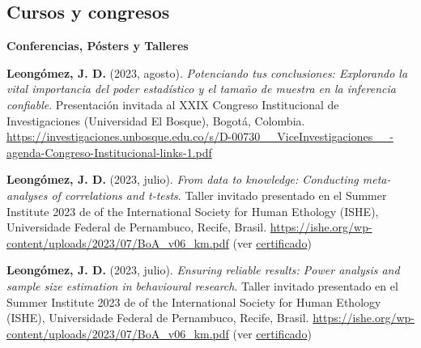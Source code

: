 \documentclass[11pt,a4paper,]{awesome-cv}
\begin{document}
\hypertarget{cursos-y-congresos}{%
\subsection{Cursos y congresos}\label{cursos-y-congresos}}

\begin{cventries}
\end{cventries}

\blacktriangleright\blacktriangleright\blacktriangleright\space \textbf{Conferencias, Pósters y Talleres}

\begingroup
\footnotesize
\setlength{\parindent}{-0.5in}
\setlength{\leftskip}{0.5in}

\textbf{Leongómez, J. D.} (2023, agosto). \emph{Potenciando tus
conclusiones: Explorando la vital importancia del poder estadístico y el
tamaño de muestra en la inferencia confiable}. Presentación invitada al
XXIX Congreso Institucional de Investigaciones (Universidad El Bosque),
Bogotá, Colombia.
\url{https://investigaciones.unbosque.edu.co/s/D-00730__ViceInvestigaciones__-agenda-Congreso-Institucional-links-1.pdf}

\textbf{Leongómez, J. D.} (2023, julio). \emph{From data to knowledge:
Conducting meta-analyses of correlations and t-tests}. Taller invitado
presentado en el Summer Institute 2023 de of the International Society
for Human Ethology (ISHE), Universidade Federal de Pernambuco, Recife,
Brasil. \url{https://ishe.org/wp-content/uploads/2023/07/BoA_v06_km.pdf}
(ver
\href{https://jdleongomez.info/es/files/Cert_ISHE_2023.pdf}{certificado})

\textbf{Leongómez, J. D.} (2023, julio). \emph{Ensuring reliable
results: Power analysis and sample size estimation in behavioural
research}. Taller invitado presentado en el Summer Institute 2023 de of
the International Society for Human Ethology (ISHE), Universidade
Federal de Pernambuco, Recife, Brasil.
\url{https://ishe.org/wp-content/uploads/2023/07/BoA_v06_km.pdf} (ver
\href{https://jdleongomez.info/es/files/Cert_ISHE_2023.pdf}{certificado})
\end{document}
